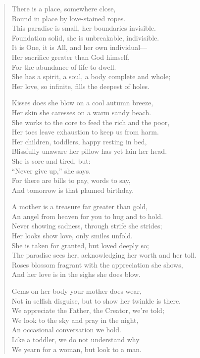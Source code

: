 \documentclass[11pt, letterpaper]{article}
\begin{document}
\begin{verse}
There is a place, somewhere close,\\
Bound in place by love-stained ropes.\\
This paradise is small, her boundaries invisible.\\
Foundation solid, she is unbreakable, indivisible.\\
It is One, it is All, and her own individual---\\
Her sacrifice greater than God himself,\\
For the abundance of life to dwell.\\
She has a spirit, a soul, a body complete and whole;\\
Her love, so infinite, fills the deepest of holes.

Kisses does she blow on a cool autumn breeze,\\
Her skin she caresses on a warm sandy beach.\\
She works to the core to feed the rich and the poor,\\
Her toes leave exhaustion to keep us from harm.\\
Her children, toddlers, happy resting in bed,\\
Blissfully unaware her pillow has yet lain her head.\\
She is sore and tired, but:\\
``Never give up,'' she says.\\
For there are bills to pay, words to say,\\
And tomorrow is that planned birthday.

A mother is a treasure far greater than gold,\\
An angel from heaven for you to hug and to hold.\\
Never showing sadness, through strife she strides;\\
Her looks show love, only smiles unfold.\\
She is taken for granted, but loved deeply so;\\
The paradise sees her, acknowledging her worth and her toll.\\
Roses blossom fragrant with the appreciation she shows,\\
And her love is in the sighs she does blow.

Gems on her body your mother does wear,\\
Not in selfish disguise, but to show her twinkle is there.\\
We appreciate the Father, the Creator, we’re told;\\
We look to the sky and pray in the night,\\
An occasional conversation we hold.\\
Like a toddler, we do not understand why\\
We yearn for a woman, but look to a man.


\end{verse}
\end{document}
